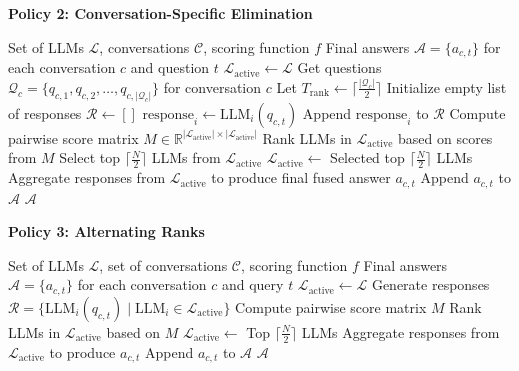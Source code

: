 \documentclass[sigconf,authordraft]{acmart}
\begin{document}
\begin{algorithm}
\textbf{Policy 2: Conversation-Specific Elimination}
\label{alg:dynamic_elimination}
\begin{algorithmic}[1]
\Require Set of LLMs $\mathcal{L}$, conversations $\mathcal{C}$, scoring function $f$
\Ensure Final answers $\mathcal{A} = \{a_{c,t}\}$ for each conversation $c$ and question $t$
    \State $\mathcal{L}_{\text{active}} \gets \mathcal{L}$ 
    \State Get questions $\mathcal{Q}_c = \{q_{c,1}, q_{c,2}, \dots, q_{c,|\mathcal{Q}_c|}\}$ for conversation $c$
    \State Let $T_{\text{rank}} \gets \lceil \frac{|\mathcal{Q}_c|}{2} \rceil$ 
        \State Initialize empty list of responses $\mathcal{R} \gets []$
            \State $\text{response}_i \gets \text{LLM}_i(q_{c,t})$ 
            \State Append $\text{response}_i$ to $\mathcal{R}$
        \EndFor
         
            \State Compute pairwise score matrix $M \in \mathbb{R}^{|\mathcal{L}_{\text{active}}| \times |\mathcal{L}_{\text{active}}|}$
            \State Rank LLMs in $\mathcal{L}_{\text{active}}$ based on scores from $M$
            \State Select top $\lceil \frac{N}{2} \rceil$ LLMs from $\mathcal{L}_{\text{active}}$
            \State $\mathcal{L}_{\text{active}} \gets$ Selected top $\lceil \frac{N}{2} \rceil$ LLMs
        \EndIf
        \State Aggregate responses from $\mathcal{L}_{\text{active}}$ to produce final fused answer $a_{c,t}$
        \State Append $a_{c,t}$ to $\mathcal{A}$
    \EndFor
\EndFor
\Return $\mathcal{A}$
\end{algorithmic}

\end{algorithm}

\begin{algorithm}
\textbf{Policy 3: Alternating Ranks}
\begin{algorithmic}[1]
\Require Set of LLMs $\mathcal{L}$, set of conversations $\mathcal{C}$, scoring function $f$
\Ensure Final answers $\mathcal{A} = \{a_{c,t}\}$ for each conversation $c$ and query $t$
    \State $\mathcal{L}_{\text{active}} \gets \mathcal{L}$
        \State Generate responses $\mathcal{R} = \{\text{LLM}_i(q_{c,t}) \mid \text{LLM}_i \in \mathcal{L}_{\text{active}}\}$
            \State Compute pairwise score matrix $M$
            \State Rank LLMs in $\mathcal{L}_{\text{active}}$ based on $M$
            \State $\mathcal{L}_{\text{active}} \gets$ Top $\lceil \frac{N}{2} \rceil$ LLMs
        \EndIf
        \State Aggregate responses from $\mathcal{L}_{\text{active}}$ to produce $a_{c,t}$
        \State Append $a_{c,t}$ to $\mathcal{A}$
    \EndFor
\EndFor
\Return $\mathcal{A}$
\end{algorithmic}
\end{algorithm}
\end{document}
